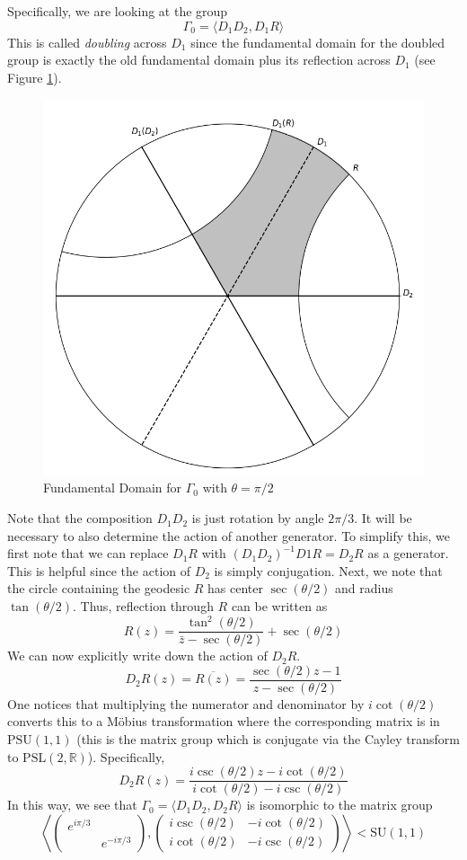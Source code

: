 \documentclass[]{article}
\begin{document}
Specifically, we are looking at the group
$$
\Gamma_0 = \langle D_1D_2, D_1R \rangle
$$
This is called \textit{doubling} across $D_1$ since the fundamental domain for the doubled group is exactly the old fundamental domain plus its reflection across $D_1$ (see Figure \ref{fd_reflection_doubled}).
\begin{figure}
	\centering
	\includegraphics[width=0.5\linewidth]{reflection_doubled.png}
	\caption{Fundamental Domain for $\Gamma_0$ with $\theta = \pi/2$}
	\label{fd_reflection_doubled}
\end{figure}
Note that the composition $D_1D_2$ is just rotation by angle $2\pi/3$.
It will be necessary to also determine the action of another generator.
To simplify this, we first note that we can replace $D_1R$ with $(D_1D_2)^{-1}D1R = D_2R$ as a generator.
This is helpful since the action of $D_2$ is simply conjugation.
Next, we note that the circle containing the geodesic $R$ has center $\sec(\theta/2)$ and radius $\tan(\theta/2)$.
Thus, reflection through $R$ can be written as
$$
R(z) = \frac{\tan^2(\theta/2)}{\bar{z} - \sec(\theta/2)} + \sec(\theta/2)
$$
We can now explicitly write down the action of $D_2R$.
$$
D_2R(z) = \overline{R(z)} =
\frac{\sec(\theta/2)z - 1}{z - \sec(\theta/2)}
$$
One notices that multiplying the numerator and denominator by $i\cot(\theta/2)$ converts this to a M\"obius transformation where the corresponding matrix is in $\text{PSU}(1, 1)$ (this is the matrix group which is conjugate via the Cayley transform to $\text{PSL}(2, \mathbb{R})$).
Specifically,
$$
D_2R(z) = \frac{i\csc(\theta/2)z - i\cot(\theta/2)}{i\cot(\theta/2) - i\csc(\theta/2)}
$$
In this way, we see that $\Gamma_0 = \langle D_1D_2, D_2R \rangle$ is isomorphic to the matrix group
$$
\left\langle
\begin{pmatrix}
e^{i\pi/3} & ~ \\
~ & e^{-i\pi/3}
\end{pmatrix},
\begin{pmatrix}
i\csc(\theta/2) & -i\cot(\theta/2) \\
i\cot(\theta/2) & -i\csc(\theta/2)
\end{pmatrix}
\right\rangle < \text{SU}(1, 1)
$$
\end{document}
